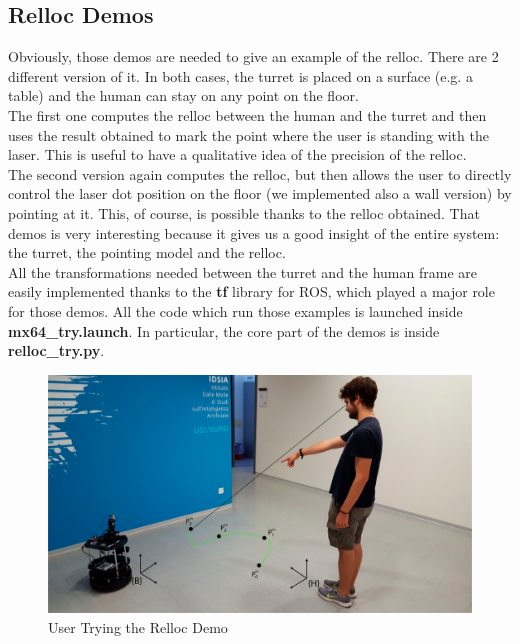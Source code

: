 \subsection{Relloc Demos}
Obviously, those demos are needed to give an example of the relloc. There are 2 different version of it. In both cases, the turret is placed on a surface (e.g. a table) and the human can stay on any point on the floor.\\ The first one computes the relloc between the human and the turret and then uses the result obtained to mark the point where the user is standing with the laser. This is useful to have a qualitative idea of the precision of the relloc.\\
The second version again computes the relloc, but then allows the user to directly control the laser dot position on the floor (we implemented also a wall version) by pointing at it. This, of course, is possible thanks to the relloc obtained. That demos is very interesting because it gives us a good insight of the entire system: the turret, the pointing model and the relloc.\\
All the transformations needed between the turret and the human frame are easily implemented thanks to the \textbf{tf} library for ROS, which played a major role for those demos. All the code which run those examples is launched inside \textbf{mx64\_try.launch}. In particular, the core part of the demos is inside \textbf{relloc\_try.py}.
\begin{figure}
	\centering
	\includegraphics[width=\textwidth]{img/rellocDemo.png}%
	\caption{User Trying the Relloc Demo}
	\label{fig:rellocDemo}
\end{figure}
